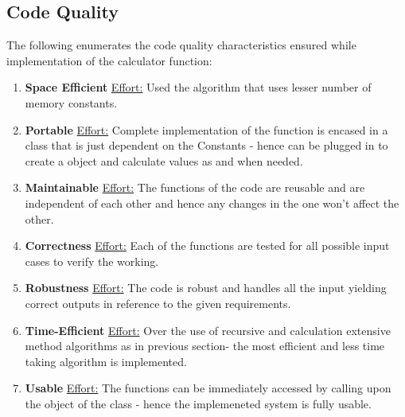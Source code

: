 \documentclass[a4paper,12pt]{article}
\begin{document}
\subsection{Code Quality}
The following enumerates the code quality characteristics ensured while implementation of the calculator function:
    \begin{enumerate}
        \item \textbf{Space Efficient}\newline
        \underline{Effort:} Used the algorithm that uses lesser number of memory constants.
        \item\textbf{Portable}\newline
        \underline{Effort:} Complete implementation of the function is encased in a class that is just dependent on the Constants - hence can be plugged in to create a object and calculate values as and when needed.
        \item\textbf{Maintainable}\newline
        \underline{Effort:} The functions of the code are reusable and are independent of each other and hence any changes in the one won't affect the other.
        \item\textbf{Correctness}\newline
        \underline{Effort:} Each of the functions are tested for all possible input cases to verify the working.
        \item\textbf{Robustness}\newline
        \underline{Effort:} The code is robust and handles all the input yielding correct outputs in reference to the given requirements.
        \item\textbf{Time-Efficient}\newline
        \underline{Effort:} Over the use of recursive and calculation extensive method algorithms as in previous section- the most efficient and less time taking algorithm is implemented.
         \item\textbf{Usable}\newline
        \underline{Effort:} The functions can be immediately accessed by calling upon the object of the class - hence the implemeneted system is fully usable.
    \end{enumerate}
\pagebreak
\end{document}
